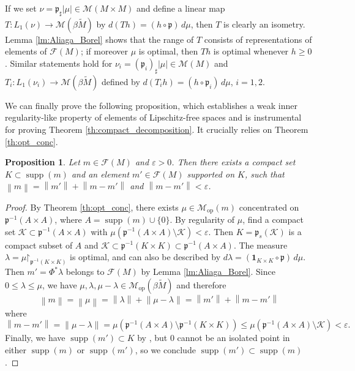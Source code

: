 \documentclass[a4paper,10pt]{amsart}
\DeclareMathOperator{\supp}{supp}                           %
\newcommand{\abs}[1]{\left|{#1}\right|}                     %
\newcommand{\norm}[1]{\left\|{#1}\right\|}                  %
\newcommand{\restrict}{\mathord{\upharpoonright}}           %
\newcommand{\lipfree}[1]{\mathcal{F}({#1})}                 %
\newcommand{\meas}[1]{\mathcal{M}({#1})}                    %
\newcommand{\wt}[1]{\widetilde{#1}}                         %
\newcommand{\bwt}[1]{\beta\wt{#1}}                          %
\newcommand{\pp}{\mathfrak{p}}                              %
\newcommand{\opr}[1]{\mathcal{M}_{\mathrm{op}}(#1)}         %
\renewcommand{\leq}{\leqslant}
\renewcommand{\geq}{\geqslant}
\newcommand{\ep}{\varepsilon}
\theoremstyle{plain}
\newtheorem{proposition}[theorem]{Proposition}
\theoremstyle{definition}
\theoremstyle{remark}
\begin{document}
If we set $\nu=\pp_\sharp\abs{\mu} \in \meas{M\times M}$ and define a linear map $T:L_1(\nu)\to \meas{\bwt{M}}$ by $d(Th) = (h\circ\pp)\,d\mu$, then $T$ is clearly an isometry. Lemma \ref{lm:Aliaga_Borel} shows that the range of $T$ consists of representations of elements of $\lipfree{M}$; if moreover $\mu$ is optimal, then $Th$ is optimal whenever $h \geq 0$. Similar statements hold for $\nu_i=(\pp_i)_\sharp\abs{\mu}\in\meas{M}$ and $T_i:L_1(\nu_i)\to\meas{\bwt{M}}$ defined by $d(T_ih)=(h\circ\pp_i)\,d\mu$, $i=1,2$.


\medskip

We can finally prove the following proposition, which establishes a weak inner regularity-like property of elements of Lipschitz-free spaces and is instrumental for proving Theorem \ref{th:compact_decomposition}. It crucially relies on Theorem \ref{th:opt_conc}.

\begin{proposition}\label{pr:inner regularity}
Let $m \in \lipfree{M}$ and $\ep>0$. Then there exists a compact set $K \subset \supp(m)$ and an element $m' \in \lipfree{M}$ supported on $K$, such that $\norm{m}=\norm{m'} + \norm{m-m'}$ and $\norm{m-m'} < \ep$.
\end{proposition}

\begin{proof}
By Theorem \ref{th:opt_conc}, there exists $\mu\in\opr{m}$ concentrated on $\pp^{-1}(A \times A)$, where $A=\supp(m)\cup\{0\}$. By regularity of $\mu$, find a compact set $\mathcal{K}\subset\pp^{-1}(A\times A)$ with $\mu(\pp^{-1}(A\times A)\setminus\mathcal{K})<\varepsilon$. Then $K=\pp_s(\mathcal{K})$ is a compact subset of $A$ and $\mathcal{K}\subset\pp^{-1}(K\times K)\subset\pp^{-1}(A\times A)$. The measure $\lambda=\mu\restrict_{\pp^{-1}(K\times K)}$ is optimal, and can also be described by $d\lambda=(\mathbf{1}_{K\times K}\circ\pp)\,d\mu$. Then $m'=\Phi^*\lambda$ belongs to $\lipfree{M}$ by Lemma \ref{lm:Aliaga_Borel}. Since $0\leq\lambda\leq\mu$, we have $\mu,\lambda,\mu-\lambda \in \opr{\bwt{M}}$ and therefore
\[
\norm{m} = \norm{\mu} = \norm{\lambda} + \norm{\mu-\lambda} = \norm{m'} + \norm{m-m'}
\]
where
$$
\norm{m-m'} = \norm{\mu-\lambda} = \mu(\pp^{-1}(A\times A)\setminus \pp^{-1}(K\times K)) \leq \mu(\pp^{-1}(A\times A)\setminus \mathcal{K}) < \varepsilon .
$$
Finally, we have $\supp(m')\subset K$ by \cite[Lemma 8]{Aliaga}, but $0$ cannot be an isolated point in either $\supp(m)$ or $\supp(m')$, so we conclude $\supp(m')\subset\supp(m)$.
\end{proof}
\end{document}
